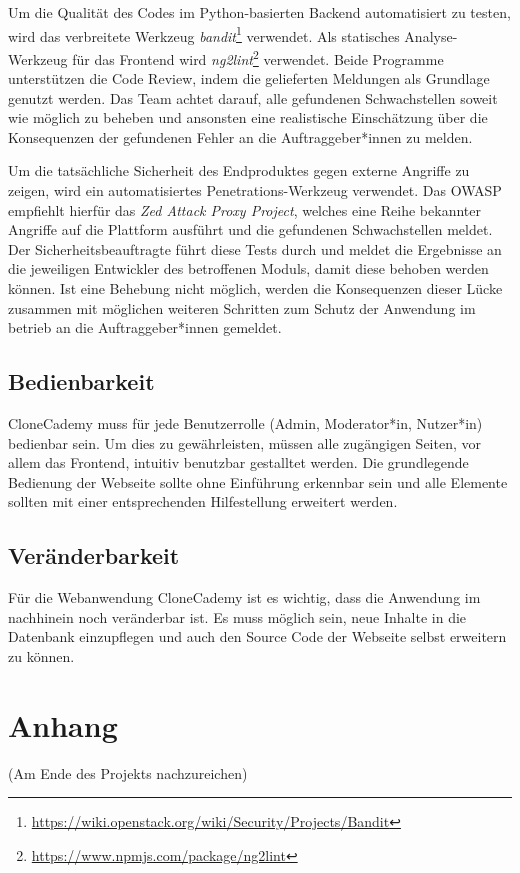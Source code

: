 \documentclass[accentcolor=tud0b,12pt,paper=a4]{tudreport}
\begin{document}
Um die Qualität des Codes im Python-basierten Backend automatisiert zu testen, wird das verbreitete Werkzeug \emph{bandit}\footnote{\href{https://wiki.openstack.org/wiki/Security/Projects/Bandit}{https://wiki.openstack.org/wiki/Security/Projects/Bandit}} verwendet. Als statisches Analyse-Werkzeug für das Frontend wird \emph{ng2lint}\footnote{\href{https://www.npmjs.com/package/ng2lint}{https://www.npmjs.com/package/ng2lint}} verwendet. Beide Programme unterstützen die Code Review, indem die gelieferten Meldungen als Grundlage genutzt werden. Das Team achtet darauf, alle gefundenen Schwachstellen soweit wie möglich zu beheben und ansonsten eine realistische Einschätzung über die Konsequenzen der gefundenen Fehler an die Auftraggeber*innen zu melden.

Um die tatsächliche Sicherheit des Endproduktes gegen externe Angriffe zu zeigen, wird ein automatisiertes Penetrations-Werkzeug verwendet. Das OWASP empfiehlt hierfür das \emph{Zed Attack Proxy Project}, welches eine Reihe bekannter Angriffe auf die Plattform ausführt und die gefundenen Schwachstellen meldet. Der Sicherheitsbeauftragte führt diese Tests durch und meldet die Ergebnisse an die jeweiligen Entwickler des betroffenen Moduls, damit diese behoben werden können. Ist eine Behebung nicht möglich, werden die Konsequenzen dieser Lücke zusammen mit möglichen weiteren Schritten zum Schutz der Anwendung im betrieb an die Auftraggeber*innen gemeldet.

\section{Bedienbarkeit}
CloneCademy muss für jede Benutzerrolle (Admin, Moderator*in, Nutzer*in) bedienbar sein. Um dies zu gewährleisten, müssen alle zugängigen Seiten, vor allem das Frontend, intuitiv benutzbar gestalltet werden. Die grundlegende Bedienung der Webseite sollte ohne Einführung erkennbar sein und alle Elemente sollten mit einer entsprechenden Hilfestellung erweitert werden.

\section{Veränderbarkeit}
Für die Webanwendung CloneCademy ist es wichtig, dass die Anwendung im nachhinein noch veränderbar ist. Es muss möglich sein, neue Inhalte in die Datenbank einzupflegen und auch den Source Code der Webseite selbst erweitern zu können.




\appendix
	\chapter{Anhang}
		(Am Ende des Projekts nachzureichen)\\
\end{document}
